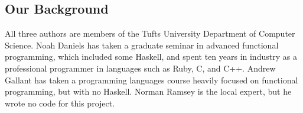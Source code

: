 \documentclass[preprint]{sigplanconf}
\begin{document}
% 



\subsection{Our Background}

All three authors are members of the Tufts University Department of Computer 
Science. Noah Daniels has taken a graduate seminar in advanced functional 
programming, which included some Haskell, and spent ten years in industry as a 
professional programmer in languages such as Ruby, C, and C++. Andrew Gallant 
has taken a programming languages course heavily focused on functional 
programming, but with no Haskell. Norman Ramsey is the local expert, but he 
wrote no code for this project.
\end{document}
